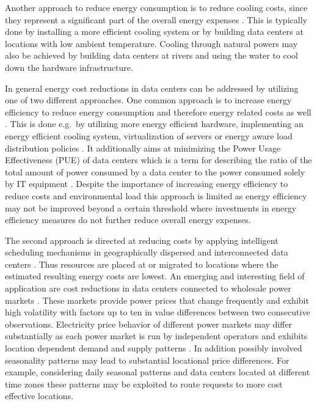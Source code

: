 Another approach to reduce energy consumption is to reduce cooling costs, since they represent a significant part of the overall energy expenses \cite{patterson2008effect}. This is typically done by installing a more efficient cooling system or by building data centers at locations with low ambient temperature. Cooling through natural powers may also be achieved by building data centers at rivers and using the water to cool down the hardware infrastructure. 

In general energy cost reductions in data centers can be addressed by utilizing one of two different approaches. One common approach is to increase energy efficiency to reduce energy consumption and therefore energy related costs as well \cite{lee2012energy, beloglazov2012energy, berl2010energy, buyya2010energy}. This is done e.g.~by utilizing more energy efficient hardware, implementing an energy efficient cooling system, virtualization of servers or energy aware load distribution policies \cite{patterson2008effect, liu2009greencloud, berl2010energy}. It additionally aims at minimizing the Power Usage Effectiveness (PUE) of data centers which is a term for describing the ratio of the total amount of power consumed by a data center to the power consumed solely by IT equipment \cite{avelar2012pue}. 
Despite the importance of increasing energy efficiency to reduce costs and environmental load this approach is limited as energy efficiency may not be improved beyond a certain threshold where investments in energy efficiency measures do not further reduce overall energy expenses. 

The second approach is directed at reducing costs by applying intelligent scheduling mechanisms in geographically dispersed and interconnected data centers \cite{guler2013cutting, qureshi2009cutting}. Thus resources are placed at or migrated to locations where the estimated resulting energy costs are lowest. 
An emerging and interesting field of application are cost reductions in data centers connected to wholesale power markets \cite{rao2010minimizing}. These markets provide power prices that change frequently and exhibit high volatility with factors up to ten in value differences between two consecutive observations. 
Electricity price behavior of different power markets may differ substantially as each power market is run by independent operators and exhibits location dependent demand and supply patterns \cite{mugele2005stable}. In addition possibly involved seasonality patterns may lead to substantial locational price differences. For example, considering daily seasonal patterns and data centers located at different time zones these patterns may be exploited to route requests to more cost effective locations. 

